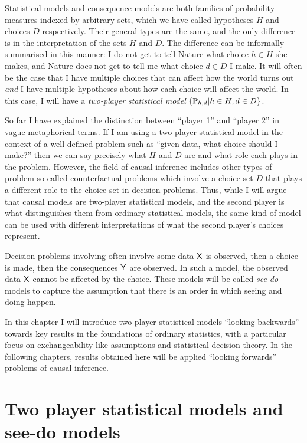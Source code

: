 Statistical models and consequence models are both families of probability measures indexed by arbitrary sets, which we have called hypotheses $H$ and choices $D$ respectively. Their general types are the same, and the only difference is in the interpretation of the sets $H$ and $D$. The difference can be informally summarised in this manner: I do not get to tell Nature what choice $h\in H$ she makes, and Nature does not get to tell me what choice $d\in D$ I make. It will often be the case that I have multiple choices that can affect how the world turns out \emph{and} I have multiple hypotheses about how each choice will affect the world. In this case, I will have a \emph{two-player statistical model} $\{\mathbb{P}_{h,d}|h\in H,d\in D\}$. 

So far I have explained the distinction between ``player 1'' and ``player 2'' in vague metaphorical terms. If I am using a two-player statistical model in the context of a well defined problem such as ``given data, what choice should I make?'' then we can say precisely what $H$ and $D$ are and what role each plays in the problem. However, the field of causal inference includes other types of problem so-called counterfactual problems which involve a choice set $D$ that plays a different role to the choice set in decision problems. Thus, while I will argue that causal models are two-player statistical models, and the second player is what distinguishes them from ordinary statistical models, the same kind of model can be used with different interpretations of what the second player's choices represent.

Decision problems involving often involve some data $\mathsf{X}$ is observed, then a choice is made, then the consequences $\mathsf{Y}$ are observed. In such a model, the observed data $\mathsf{X}$ cannot be affected by the choice. These models will be called \emph{see-do} models to capture the assumption that there is an order in which seeing and doing happen.

In this chapter I will introduce two-player statistical models ``looking backwards'' towards key results in the foundations of ordinary statistics, with a particular focus on exchangeability-like assumptions and statistical decision theory. In the following chapters, results obtained here will be applied ``looking forwards'' problems of causal inference.

\section{Two player statistical models and see-do models}

